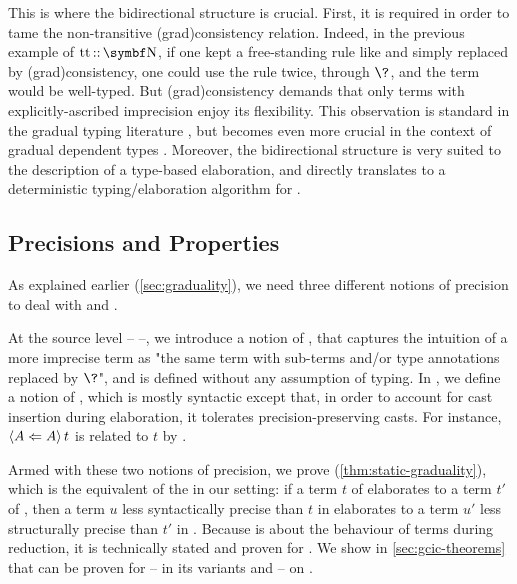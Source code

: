 This is where the bidirectional structure is crucial.
First, it is required in order to tame the non-transitive \kl(grad){consistency} relation.
Indeed, in the previous example of $\asc{\true}{\Nat}$, if one kept a free-standing rule like
 and simply replaced  by \kl(grad){consistency}, one could
use the rule twice, through $\?$, and the term would be well-typed.
But \kl(grad){consistency} demands that only terms with explicitly-ascribed
imprecision enjoy its flexibility.
This observation is standard in the gradual typing literature
, but becomes even more crucial in the context of
gradual dependent types .
Moreover, the bidirectional structure is very suited to the description of
a type-based elaboration, and directly translates to a deterministic typing/elaboration
algorithm for .

\subsection{Precisions and Properties}
\label{sec:precision-graduality}

As explained earlier (\cref{sec:graduality}), we need three different notions of
precision to deal with  and .

\AP At the source level –  –,
we introduce a notion of , that captures the
intuition of a more imprecise term as "the same term with sub-terms and/or
type annotations replaced by $\?$", and is defined without any assumption of typing.
In , we define a notion of ,
which is mostly syntactic except that, in order to account for cast insertion during elaboration, it tolerates precision-preserving casts.
For instance, $\castrev{t}{A}{A}$ is related to $t$ by .

Armed with these two notions of precision, we prove
 (\cref{thm:static-graduality}), which is
the equivalent of the  in our setting:
if a term $t$ of  elaborates to a term $t'$ of ,
then a term $u$ less syntactically precise than $t$ in  elaborates to
a term $u'$ less structurally precise than $t'$ in .
%
Because  is about the behaviour of terms during reduction,
it is technically stated and proven for .
We show in \cref{sec:gcic-theorems} that  can be proven
for  – in its variants  and  – on .

